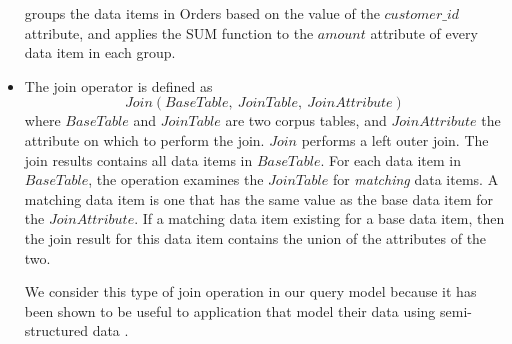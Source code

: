\begin{itemize}
  groups the data items in Orders based on the value of the $customer\_id$ attribute,
  and applies the SUM function to the $amount$ attribute of every data item in each group.

  \item The join operator is defined as
  \[
  Join(BaseTable,~JoinTable,~JoinAttribute)
  \]
  where $BaseTable$ and $JoinTable$ are two corpus tables, and $JoinAttribute$ the attribute on which to perform the join.
  $Join$ performs a left outer join.
  The join results contains all data items in $BaseTable$.
  For each data item in $BaseTable$, the operation examines the $JoinTable$ for \textit{matching} data items.
  A matching data item is one that has the same value as the base data item for the $JoinAttribute$.
  If a matching data item existing for a base data item, then the join result for this data item contains the union of the attributes of the two.

  We consider this type of join operation in our query model because it has been shown to be useful to application that
  model their data using semi-structured data \cite{mongodb:joins}.
\end{itemize}







